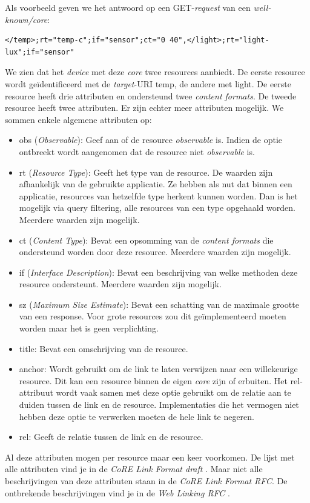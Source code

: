 \noindent
Als voorbeeld geven we het antwoord op een GET-\textit{request} van een \textit{well-known/core}:
\begin{verbatim}
</temp>;rt="temp-c";if="sensor";ct="0 40",</light>;rt="light-lux";if="sensor"
\end{verbatim}
We zien dat het \textit{device} met deze \textit{core} twee resources aanbiedt. De eerste resource wordt ge\"{i}dentificeerd met de \textit{target}-URI temp, de andere met light. De eerste resource heeft drie attributen en ondersteund twee \textit{content formats}. De tweede resource heeft twee attributen. Er zijn echter meer attributen mogelijk. We sommen enkele algemene attributen op:
\begin{itemize}
\item obs (\textit{Observable}): Geef aan of de resource \textit{observable} is. Indien de optie ontbreekt wordt aangenomen dat de resource niet \textit{observable} is.
\item rt (\textit{Resource Type}): Geeft het type van de resource. De waarden zijn afhankelijk van de gebruikte applicatie. Ze hebben als nut dat binnen een applicatie, resources van hetzelfde type herkent kunnen worden. Dan is het mogelijk via query filtering, alle resources van een type opgehaald worden. Meerdere waarden zijn mogelijk.
\item ct (\textit{Content Type}): Bevat een opsomming van de \textit{content formats} die ondersteund worden door deze resource. Meerdere waarden zijn mogelijk.
\item if (\textit{Interface Description}): Bevat een beschrijving van welke methoden deze resource ondersteunt. Meerdere waarden zijn mogelijk.
\item sz (\textit{Maximum Size Estimate}): Bevat een schatting van de maximale grootte van een response. Voor grote resources zou dit ge\"{i}mplementeerd moeten worden maar het is geen verplichting.
\item title: Bevat een omschrijving van de resource.
\item anchor: Wordt gebruikt om de link te laten verwijzen naar een willekeurige resource. Dit kan een resource binnen de eigen \textit{core} zijn of erbuiten. Het rel-attribuut wordt vaak samen met deze optie gebruikt om de relatie aan te duiden tussen de link en de resource. Implementaties die het vermogen niet hebben deze optie te verwerken moeten de hele link te negeren.
\item rel: Geeft de relatie tussen de link en de resource.
\end{itemize}
Al deze attributen mogen per resource maar een keer voorkomen. De lijst met alle attributen vind je in de \textit{CoRE Link Format draft} \cite{coapDiscovery}. Maar niet alle beschrijvingen van deze attributen staan in de \textit{CoRE Link Format RFC}. De ontbrekende beschrijvingen vind je in de \textit{Web Linking RFC} \cite{webLinking}.

